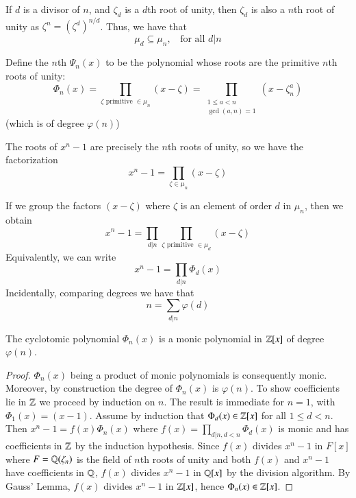 \documentclass[12pt, a4paper, oneside, openright, titlepage]{book}
\begin{document}
If $d$ is a divisor of $n$, and $\zeta_d$ is a $d$th root of unity, then $\zeta_d$ is also a $n$th root of unity as $\zeta^n = (\zeta^d)^{n/d}$. Thus, we have that \begin{equation*}
    \mu_d \subseteq \mu_n, \;\;\text{ for all } d\vert n
\end{equation*}

\begin{defn}
    Define the $n$th  $\Psi_n(x)$ to be the polynomial whose roots are the primitive $n$th roots of unity: \begin{equation*}
        \Phi_n(x) = \prod_{\zeta \text{ primitive } \in \mu_n}(x-\zeta) = \prod_{\begin{array}{cc} 1\leq a < n \\ \gcd(a,n)=1\end{array}}(x-\zeta_n^a)
    \end{equation*}
    (which is of degree $\varphi(n)$)
\end{defn}

The roots of $x^n - 1$ are precisely the $n$th roots of unity, so we have the factorization \begin{equation*}
    x^n - 1 = \prod_{\zeta \in \mu_n}(x-\zeta)
\end{equation*}

If we group the factors $(x-\zeta)$ where $\zeta$ is an element of order $d$ in $\mu_n$, then we obtain \begin{equation*}
    x^n - 1 = \prod_{d\vert n}\prod_{\zeta \text{ primitive } \in \mu_d}(x-\zeta)
\end{equation*}
Equivalently, we can write \begin{equation*}
    x^n - 1 = \prod_{d\vert n}\Phi_d(x)
\end{equation*}
Incidentally, comparing degrees we have that \begin{equation*}
    n = \sum_{d\vert n}\varphi(d)
\end{equation*}


\begin{lem}
    The cyclotomic polynomial $\Phi_n(x)$ is a monic polynomial in $\mathbb Z[x]$ of degree $\varphi(n)$.
\end{lem}
\begin{proof}
    $\Phi_n(x)$ being a product of monic polynomials is consequently monic. Moreover, by construction the degree of $\Phi_n(x)$ is $\varphi(n)$. To show coefficients lie in $\mathbb Z$ we proceed by induction on $n$. The result is immediate for $n = 1$, with $\Phi_1(x) = (x-1)$. Assume by induction that $\Phi_d(x) \in \mathbb Z[x]$ for all $1 \leq d < n$. Then $x^n - 1 = f(x)\Phi_n(x)$ where $f(x) = \prod_{d\vert n,d <n}\Phi_d(x)$ is monic and has coefficients in $\mathbb Z$ by the induction hypothesis. Since $f(x)$ divides $x^n -1$ in $F[x]$ where $F = \mathbb Q(\zeta_n)$ is the field of $n$th roots of unity and both $f(x)$ and $x^n-1$ have coefficients in $\mathbb Q$, $f(x)$ divides $x^n-1$ in $\mathbb Q[x]$ by the division algorithm. By Gauss' Lemma, $f(x)$ divides $x^n-1$ in $\mathbb Z[x]$, hence $\Phi_n(x) \in \mathbb Z[x]$.
\end{proof}
\end{document}
